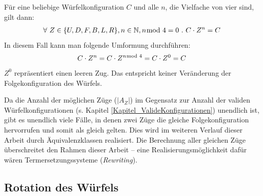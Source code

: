 \documentclass[12pt,a4paper, usenames, dvipsnames]{article}
\theoremstyle{mystyle}
\theoremstyle{definition}
\begin{document}
Für eine beliebige Würfelkonfiguration $C$ und alle $n$, die Vielfache von vier sind, gilt dann:
\begin{align*}
\forall \  Z \in \{U, D, F, B, L, R\}, n \in \mathbb{N}, n \hspace*{-0.6em} \mod 4 = 0 \ . \ 
C \cdot Z^n  
= C
\end{align*}
In diesem Fall kann man folgende Umformung durchführen:
\begin{align*}
C \cdot Z^n
= C \cdot Z^{n \hspace*{-0.5em} \mod 4} 
= C \cdot Z^0 
= C
\end{align*}
$Z^0$ repräsentiert einen leeren Zug. Das entspricht keiner Veränderung der Folgekonfiguration des Würfels.



Da die Anzahl der möglichen Züge ($|A_Z|$) im Gegensatz zur Anzahl der validen Würfel\-konfigurationen (s. Kapitel \ref{Kapitel_ValideKonfigurationen}) unendlich ist, gibt es unendlich viele Fälle, in denen zwei Züge die gleiche Folgekonfiguration hervorrufen und somit als gleich gelten. Dies wird im weiteren Verlauf dieser Arbeit durch Äquivalenzklassen realisiert. Die Berechnung aller gleichen Züge überschreitet den Rahmen dieser Arbeit -- eine Realisierungsmöglichkeit dafür wären Termersetzungssysteme (\textit{Rewriting}).


%
%
%
%
%
%
%
%
%
%

\subsection{Rotation des Würfels}

\label{Abschnitt_RotationDesWürfels}
\end{document}
